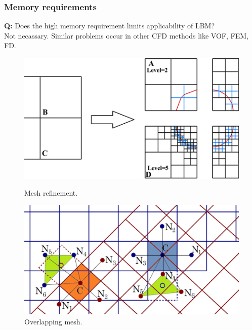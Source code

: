 \documentclass[10pt,handout]{beamer}
\begin{document}
\begin{frame}\frametitle{Memory requirements}
\textbf{Q:} Does the high memory requirement limits applicability of LBM? \\ \vspace{1.5em}
\pause
Not necassary. Similar problems occur in other CFD methods like VOF, FEM, FD.
\begin{figure}
  \begin{minipage}[c]{0.45\textwidth}
    \includegraphics[width=\textwidth]{obrazki/mesh_refinement.jpeg} 
    \caption{Mesh refinement.}
  \end{minipage}\hfill
  \begin{minipage}[c]{0.45\textwidth} %
    \includegraphics[width=\textwidth]{obrazki/oveset_mesh.png} 
    \caption{Overlapping mesh.}
  \end{minipage}
\end{figure}
\end{frame}

\end{document}

